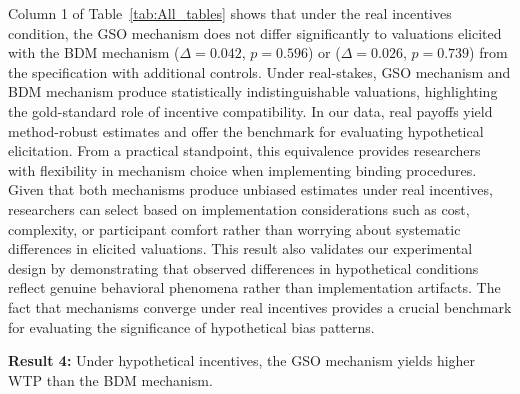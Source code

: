 \documentclass[12pt]{article}
\begin{document}
Column 1 of Table~\ref{tab:All_tables} shows that under the real incentives condition, the GSO mechanism does not differ significantly to valuations elicited with the BDM mechanism (\(\Delta = 0.042\), \(p =0.596\)) or (\(\Delta = 0.026\), \(p =0.739\)) from the specification with additional controls. Under real-stakes, GSO mechanism and BDM mechanism produce statistically indistinguishable valuations, highlighting the gold-standard role of incentive compatibility. In our data, real payoffs yield method-robust estimates and offer the benchmark for evaluating hypothetical elicitation. 
From a practical standpoint, this equivalence provides researchers with flexibility in mechanism choice when implementing binding procedures. Given that both mechanisms produce unbiased estimates under real incentives, researchers can select based on implementation considerations such as cost, complexity, or participant comfort rather than worrying about systematic differences in elicited valuations.
This result also validates our experimental design by demonstrating that observed differences in hypothetical conditions reflect genuine behavioral phenomena rather than implementation artifacts. The fact that mechanisms converge under real incentives provides a crucial benchmark for evaluating the significance of hypothetical bias patterns. 


\vspace{0.5cm}



\textbf{Result 4:} Under hypothetical incentives, the GSO mechanism yields higher WTP than the BDM mechanism.
\end{document}
